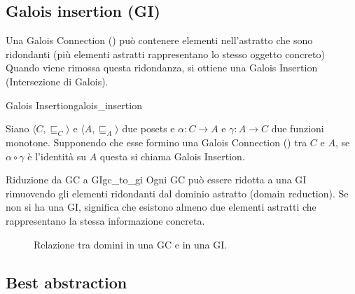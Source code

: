 \subsection{Galois insertion (GI)}

Una Galois Connection () può contenere elementi
nell'astratto che sono ridondanti (più elementi astratti rappresentano lo
stesso oggetto concreto)
Quando viene rimossa questa ridondanza, si ottiene una Galois Insertion
(Intersezione di Galois).

\begin{definizione}{Galois Insertion}{galois_insertion}

    Siano $\langle C, \sqsubseteq_C \rangle$ e $\langle A, \sqsubseteq_A \rangle$
due posets e $\alpha: C \rightarrow A$ e $\gamma: A \rightarrow C$ due funzioni
monotone. Supponendo che esse formino una Galois Connection
() tra $C$ e $A$, se $\alpha \circ \gamma$ è
l'identità su $A$ questa si chiama Galois Insertion.

\end{definizione}

\begin{nota}{Riduzione da GC a GI}{gc_to_gi}
Ogni GC può essere ridotta a una GI rimuovendo gli elementi ridondanti
dal dominio astratto (domain reduction).
Se non si ha una GI, significa che esistono almeno due elementi astratti che
rappresentano la stessa informazione concreta.
\end{nota}

\begin{figure}[H]
    \centering
    \caption{Relazione tra domini in una GC e in una GI.}
    \label{fig:gc_vs_gi}
\end{figure}

\subsection{Best abstraction}

